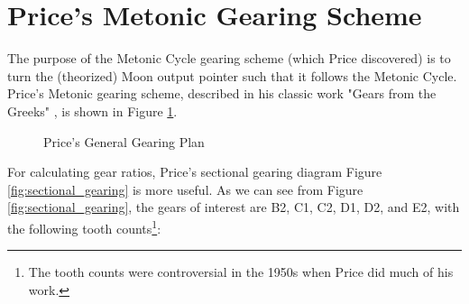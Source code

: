 \documentclass[11pt, oneside]{article}   	%
\theoremstyle{definition}
\begin{document}
\section{Price's Metonic Gearing Scheme}
The purpose of the Metonic Cycle gearing scheme (which Price discovered) is to turn the (theorized) Moon output pointer such that it follows the Metonic Cycle.
Price's Metonic gearing scheme, described in his classic work "Gears from the Greeks" \cite{gears_from_the_greeks}, is shown in Figure \ref{fig:general_gearing_plan}. 

\bigskip
\begin{figure}[H]
\caption{Price's General Gearing Plan \cite{gears_from_the_greeks}}
\label{fig:general_gearing_plan}
\end{figure}

\bigskip
\noindent
For calculating gear ratios,  Price's sectional gearing diagram Figure \ref{fig:sectional_gearing} is more useful. As we can see from Figure \ref{fig:sectional_gearing}, the gears of interest
are B2, C1, C2, D1, D2, and E2, with the following tooth counts\footnote{The tooth counts were controversial in the 1950s when Price did much of his work.}:
\end{document}
